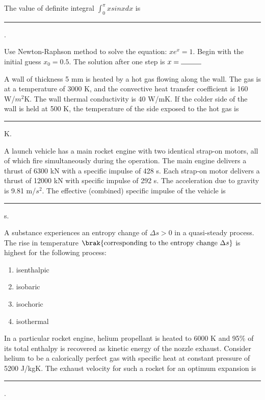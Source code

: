 \iffalse
  \title{GateAssignment4}
  \author{EE24BTECH11048-NITHIN.K}
  \section{ae}
  \chapter{2016} 
\fi
\item The value of definite integral $\int_{0}^{\pi}xsinxdx$ is \rule{1cm}{0.4pt}.
\item Use Newton-Raphson method to solve the equation: $xe^x = 1$. Begin with the initial guess $x_0 = 0.5$. The solution after one step is $x = \rule{1cm}{0.4pt}$
\item A wall of thickness 5 mm is heated by a hot gas flowing along the wall. The gas is at a temperature of 3000 K, and the convective heat transfer coefficient is 160 W/$m^2$K. The wall thermal conductivity is 40 W/mK. If the colder side of the wall is held at 500 K, the temperature of the side exposed to the hot gas is \rule{1cm}{0.4pt} K.
\item A launch vehicle has a main rocket engine with two identical strap-on motors, all of which fire simultaneously during the operation. The main engine delivers a thrust of 6300 kN with a specific impulse of 428 s. Each strap-on motor delivers a thrust of 12000 kN with specific impulse of 292 s. The acceleration due to gravity is 9.81 m/$s^2$. The effective (combined) specific impulse of the vehicle is \rule{1cm}{0.4pt} s.
\item A substance experiences an entropy change of $\Delta s > 0$ in a quasi-steady process. The rise in temperature $\brak{\text{corresponding to the entropy change }\Delta s}$ is highest for the following process:
\begin{enumerate}
\item isenthalpic
\item isobaric
\item isochoric
\item isothermal
\end{enumerate}
\item In a particular rocket engine, helium propellant is heated to 6000 K and 95\% of its total enthalpy is recovered as kinetic energy of the nozzle exhaust. Consider helium to be a calorically perfect gas with specific heat at constant pressure of 5200 J/kgK. The exhaust velocity for such a rocket for an optimum expansion is \rule{1cm}{0.4pt}.
